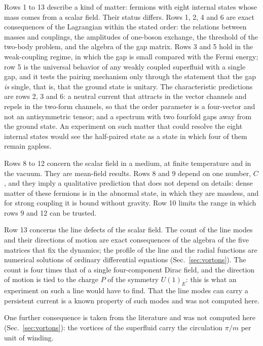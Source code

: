 Rows 1 to 13 describe a kind of matter: fermions with eight internal states whose mass comes from a
scalar field. Their status differs. Rows 1, 2, 4 and 6 are exact consequences of the Lagrangian
within the stated order: the relations between masses and couplings, the amplitudes of one-boson
exchange, the threshold of the two-body problem, and the algebra of the gap matrix. Rows 3 and 5 hold
in the weak-coupling regime, in which the gap is small compared with the Fermi energy; row 5 is the
universal behavior of any weakly coupled superfluid with a single gap, and it tests the pairing
mechanism only through the statement that the gap \emph{is} single, that is, that the ground state is
unitary. The characteristic predictions are rows 2, 3 and 6: a neutral current that attracts in the
vector channels and repels in the two-form channels, so that the order parameter is a four-vector
and not an antisymmetric tensor; and a spectrum with two fourfold gaps away from the ground state.
An experiment on such matter that could resolve the eight internal states would see the half-paired
state as a state in which four of them remain gapless.

Rows 8 to 12 concern the scalar field in a medium, at finite temperature and in the vacuum. They are
mean-field results. Rows 8 and 9 depend on one number, $C$, and they imply a qualitative prediction
that does not depend on details: dense matter of these fermions is in the abnormal state, in which
they are massless, and for strong coupling it is bound without gravity. Row 10 limits the range in
which rows 9 and 12 can be trusted.

Row 13 concerns the line defects of the scalar field. The count of the line modes and their
directions of motion are exact consequences of the algebra of the five matrices that fix the
dynamics; the profile of the line and the radial functions are numerical solutions of ordinary
differential equations (Sec.~\ref{sec:vortons}). The count is four times that of a single
four-component Dirac field, and the direction of motion is tied to the charge $P$ of the symmetry
$U(1)_E$: this is what an experiment on such a line would have to find. That the line modes can
carry a persistent current is a known property of such modes \cite{Witten1985} and was not
computed here.

One further consequence is taken from the literature and was not computed here
(Sec.~\ref{sec:vortons}): the vortices of the superfluid carry the circulation $\pi/m$ per unit of
winding.


